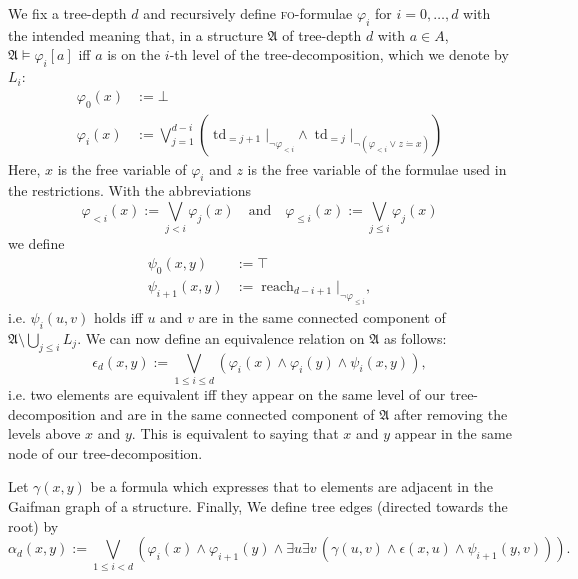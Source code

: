 \documentclass[11pt]{article}
\newcommand{\logic}[1]{\textsc{#1}}
\newcommand{\FO}{\logic{fo}}
\newcommand{\rela}[2]{\ensuremath{{#1|}_{#2}}}
\DeclareMathOperator{\reach}{reach}
\newcommand{\struct}[1]{\mathfrak{#1}}
\newcommand{\AS}{\struct{A}}
\newcommand{\td}{\operatorname{td}}
\begin{document}
We fix a tree-depth $d$ and recursively define \FO-formulae
$\varphi_i$ for $i = 0,\ldots,d$ with the intended meaning that,
in a structure $\AS$ of tree-depth $d$ with $a \in A$,
$\AS \models \varphi_i[a]$ iff $a$ is on the $i$-th level of the
tree-decomposition, which we denote by $L_{i}$: 
\[\begin{split}
\varphi_0(x) &:= \bot
\\
\varphi_i(x) &:= 
\bigvee_{j=1}^{d-i} \left(\rela{\td_{=j+1}}{\neg\varphi_{<i}} \wedge
 \rela{\td_{=j}}{\neg(\varphi_{<i} \vee z \dot = x)} \right)
\end{split}
\]
Here, $x$ is the free variable of $\varphi_i$ and $z$ is the free
variable of the formulae used in the restrictions. With the
abbreviations
\[
\varphi_{< i}(x) := \bigvee_{j < i}
\varphi_j(x)\quad\text{and}\quad
\varphi_{\leq i}(x) := \bigvee_{j \leq i}
\varphi_j(x)
\]
we define
\[\begin{split}
\psi_0(x,y) &:= \top
\\
\psi_{i+1}(x,y) &:=
\rela{\reach_{d-i+1}}{\neg \varphi_{\leq i}},
\end{split}
\]
i.e. $\psi_i(u,v)$ holds iff $u$ and $v$ are in the same connected
component of $\AS \setminus \bigcup_{j \leq i} L_j$. We can now define an
equivalence relation on $\AS$ as follows:
\[
\epsilon_d(x,y) :=
\bigvee_{1 \leq i \leq d}
(\varphi_i(x) \wedge \varphi_i(y) \wedge \psi_i(x,y)),
\]
i.e. two elements are equivalent iff they appear on the same level of
our tree-decomposition and are in the same connected component of $\AS$
after removing the levels above $x$ and $y$. This is equivalent to
saying that $x$ and $y$ appear in the same node of our
tree-decomposition.

Let $\gamma(x,y)$ be a formula which expresses
that to elements are adjacent in the Gaifman graph of a structure.
Finally, We define tree edges (directed towards the root) by
\[
\alpha_d(x,y) :=
\bigvee_{1 \leq i < d}
(\varphi_i(x) \wedge \varphi_{i+1}(y) \wedge
\exists u\exists v\,(\gamma(u,v) \wedge \epsilon(x,u) \wedge \psi_{i+1}(y,v))).
\]
\end{document}
